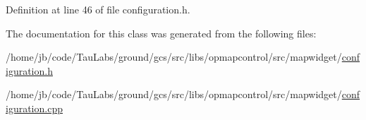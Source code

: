 \-Definition at line 46 of file configuration.\-h.



\-The documentation for this class was generated from the following files\-:\begin{DoxyCompactItemize}
\item 
/home/jb/code/\-Tau\-Labs/ground/gcs/src/libs/opmapcontrol/src/mapwidget/\hyperlink{configuration_8h}{configuration.\-h}\item 
/home/jb/code/\-Tau\-Labs/ground/gcs/src/libs/opmapcontrol/src/mapwidget/\hyperlink{configuration_8cpp}{configuration.\-cpp}\end{DoxyCompactItemize}
